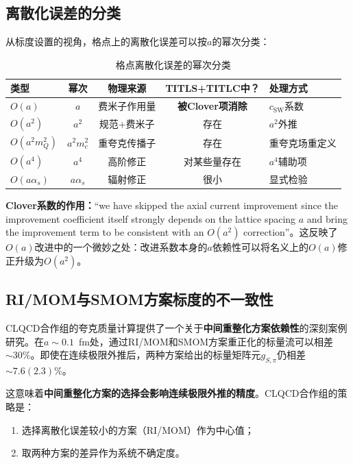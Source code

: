 \documentclass[12pt,a4paper]{ctexart}
\theoremstyle{definition}
\begin{document}
\subsection{离散化误差的分类}

从标度设置的视角，格点上的离散化误差可以按$a$的幂次分类：

\begin{table}[H]
\centering
\caption{格点离散化误差的幂次分类}
\label{tab:disc_errors}
\begin{tabular}{lcccl}
\toprule
类型 & 幂次 & 物理来源 & TITLS+TITLC中？ & 处理方式 \\
\midrule
$O(a)$ & $a$ & 费米子作用量 & \textbf{被Clover项消除} & $c_{\text{SW}}$系数 \\
$O(a^2)$ & $a^2$ & 规范+费米子 & 存在 & $a^2$外推 \\
$O(a^2 m^2_Q)$ & $a^2 m^2_c$ & 重夸克传播子 & 存在 & 重夸克场重定义 \\
$O(a^4)$ & $a^4$ & 高阶修正 & 对某些量存在 & $a^4$辅助项 \\
$O(a\alpha_s)$ & $a\alpha_s$ & 辐射修正 & 很小 & 显式检验 \\
\bottomrule
\end{tabular}
\end{table}

\textbf{Clover系数的作用：}``we have skipped the axial current improvement since the improvement coefficient itself strongly depends on the lattice spacing $a$ and bring the improvement term to be consistent with an $O(a^2)$ correction''\cite{CLQCD2025quark_mass}。这反映了$O(a)$改进中的一个微妙之处：改进系数本身的$a$依赖性可以将名义上的$O(a)$修正升级为$O(a^2)$。

\subsection{RI/MOM与SMOM方案标度的不一致性}

CLQCD合作组的夸克质量计算\cite{CLQCD2025quark_mass}提供了一个关于\textbf{中间重整化方案依赖性}的深刻案例研究。在$a \sim 0.1$~fm处，通过RI/MOM和SMOM方案重正化的标量流可以相差$\sim 30\%$。即使在连续极限外推后，两种方案给出的标量矩阵元$g_{S,\pi}$仍相差$\sim 7.6(2.3)\%$。

这意味着\textbf{中间重整化方案的选择会影响连续极限外推的精度}。CLQCD合作组的策略是：
\begin{enumerate}
    \item 选择离散化误差较小的方案（RI/MOM）作为中心值；
    \item 取两种方案的差异作为系统不确定度。
\end{enumerate}
\end{document}

